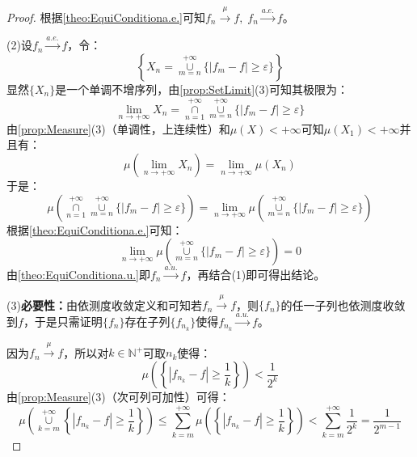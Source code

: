 \begin{proof}
	根据\cref{theo:EquiConditiona.e.}可知$f_n\overset{\mu}{\longrightarrow}f,\;f_n\overset{a.e.}{\longrightarrow}f$。\par
	(2)设$f_n\overset{a.e.}{\longrightarrow}f$，令：
	\begin{equation*}
		\left\{X_n=\underset{m=n}{\overset{+\infty}{\cup}}\{|f_m-f|\geqslant\varepsilon\}\right\}
	\end{equation*}
	显然$\{X_n\}$是一个单调不增序列，由\cref{prop:SetLimit}(3)可知其极限为：
	\begin{equation*}
		\lim_{n\to+\infty}X_n=\underset{n=1}{\overset{+\infty}{\cap}}\underset{m=n}{\overset{+\infty}{\cup}}\{|f_m-f|\geqslant\varepsilon\}
	\end{equation*}
	由\cref{prop:Measure}(3)（单调性，上连续性）和$\mu(X)<+\infty$可知$\mu(X_1)<+\infty$并且有：
	\begin{equation*}
		\mu\left(\lim_{n\to+\infty}X_n\right)=\lim_{n\to+\infty}\mu(X_n)
	\end{equation*}
	于是：
	\begin{equation*}
		\mu\left(\underset{n=1}{\overset{+\infty}{\cap}}\underset{m=n}{\overset{+\infty}{\cup}}\{|f_m-f|\geqslant\varepsilon\}\right)=\lim_{n\to+\infty}\mu\left(\underset{m=n}{\overset{+\infty}{\cup}}\{|f_m-f|\geqslant\varepsilon\}\right)
	\end{equation*}
	根据\cref{theo:EquiConditiona.e.}可知：
	\begin{equation*}
		\lim_{n\to+\infty}\mu\left(\underset{m=n}{\overset{+\infty}{\cup}}\{|f_m-f|\geqslant\varepsilon\}\right)=0
	\end{equation*}
	由\cref{theo:EquiConditiona.u.}即$f_n\overset{a.u.}{\longrightarrow}f$，再结合(1)即可得出结论。\par
	(3)\textbf{必要性：}由依测度收敛定义和可知若$f_n\overset{\mu}{\longrightarrow}f$，则$\{f_n\}$的任一子列也依测度收敛到$f$，于是只需证明$\{f_n\}$存在子列$\{f_{n_k}\}$使得$f_{n_k}\overset{a.u.}{\longrightarrow}f$。\par
	因为$f_n\overset{\mu}{\longrightarrow}f$，所以对$k\in\mathbb{N}^+$可取$n_k$使得：
	\begin{equation*}
		\mu\left(\left\{|f_{n_k}-f|\geqslant\frac{1}{k}\right\}\right)<\frac{1}{2^k}
	\end{equation*}
	由\cref{prop:Measure}(3)（次可列可加性）可得：
	\begin{equation*}
		\mu\left(\underset{k=m}{\overset{+\infty}{\cup}}\left\{|f_{n_k}-f|\geqslant\frac{1}{k}\right\}\right)\leqslant\sum_{k=m}^{+\infty}\mu\left(\left\{|f_{n_k}-f|\geqslant\frac{1}{k}\right\}\right)<\sum_{k=m}^{+\infty}\frac{1}{2^k}=\frac{1}{2^{m-1}}

\end{equation*}
\end{proof}
